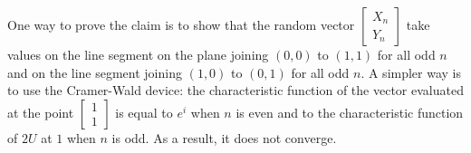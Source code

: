 \documentclass[12pt]{article}
\begin{document}
\begin{enumerate}
\begin{enumerate}
\color{blue}
One way to prove the claim is to show that the random vector $\left[ \begin{array}{c}
 X_n\\
 Y_n	
 \end{array}
\right]
$ take values on the line segment on the plane joining $(0,0)$ to $(1,1)$ for all odd $n$ and on the line segment joining $(1,0)$ to $(0,1)$ for all odd $n$. A simpler way is to use the Cramer-Wald device: the characteristic function of the vector  evaluated at the point $\left[ \begin{array}{c}
 1\\
 1	
 \end{array}
\right]$ is equal to $e^{i}$ when $n$ is even and to the characteristic function of $2U$ at $1$ when $n$ is odd. As a result, it does not converge.

\color{black}
 \end{enumerate}
 


\end{enumerate}
\end{document}
